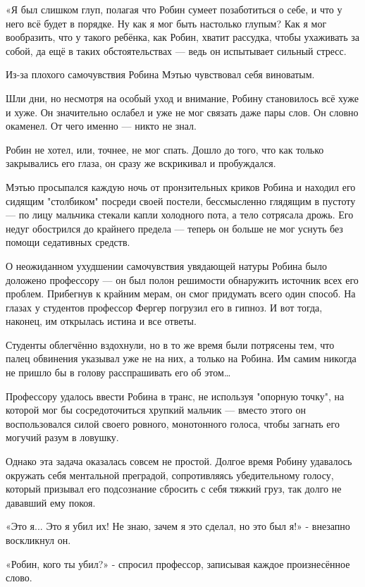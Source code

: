 \documentclass[a5paper, 9pt,
final, openany, twoside=true]{memoir}
\begin{document}
«Я был слишком глуп, полагая что Робин сумеет позаботиться о себе, и что у него всё будет в порядке. Ну как я мог быть настолько глупым? Как я мог вообразить, что у такого ребёнка, как Робин, хватит рассудка, чтобы ухаживать за собой, да ещё в таких обстоятельствах — ведь он испытывает сильный стресс.

Из-за плохого самочувствия Робина Мэтью чувствовал себя виноватым.\bigskip

Шли дни, но несмотря на особый уход и внимание, Робину становилось всё хуже и хуже. Он значительно ослабел и уже не мог связать даже пары слов. Он словно окаменел. От чего именно — никто не знал.

Робин не хотел, или, точнее, не мог спать. Дошло до того, что как только закрывались его глаза, он сразу же вскрикивал и пробуждался.

Мэтью просыпался каждую ночь от пронзительных криков Робина и находил его сидящим "столбиком" посреди своей постели, бессмысленно глядящим в пустоту — по лицу мальчика стекали капли холодного пота, а тело сотрясала дрожь. Его недуг обострился до крайнего предела — теперь он больше не мог уснуть без помощи седативных средств.\bigskip

О неожиданном ухудшении самочувствия увядающей натуры Робина было доложено профессору — он был полон решимости обнаружить источник всех его проблем. Прибегнув к крайним мерам, он смог придумать всего один способ. На глазах у студентов профессор Фергер погрузил его в гипноз. И вот тогда, наконец, им открылась истина и все ответы.

Студенты облегчённо вздохнули, но в то же время были потрясены тем, что палец обвинения указывал уже не на них, а только на Робина. Им самим никогда не пришло бы в голову расспрашивать его об этом…

Профессору удалось ввести Робина в транс, не используя "опорную точку", на которой мог бы сосредоточиться хрупкий мальчик — вместо этого он воспользовался силой своего ровного, монотонного голоса, чтобы загнать его могучий разум в ловушку.

Однако эта задача оказалась совсем не простой. Долгое время Робину удавалось окружать себя ментальной преградой, сопротивляясь убедительному голосу, который призывал его подсознание сбросить с себя тяжкий груз, так долго не дававший ему покоя.

«Это я... Это я убил их! Не знаю, зачем я это сделал, но это был я!» - внезапно воскликнул он.

«Робин, кого ты убил?» - спросил профессор, записывая каждое произнесённое слово.
\end{document}
